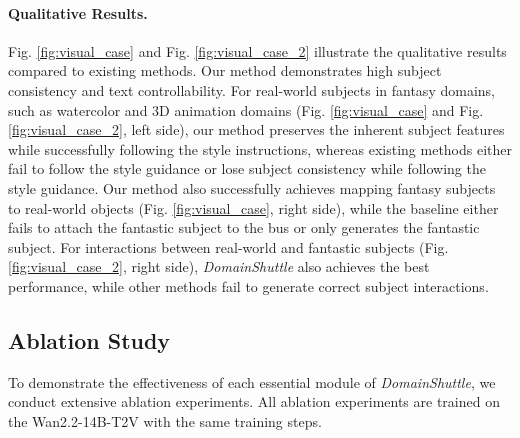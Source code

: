 \paragraph{\textbf{Qualitative Results.}} Fig. \ref{fig:visual_case} and Fig. \ref{fig:visual_case_2} illustrate the qualitative results compared to existing methods. Our method demonstrates high subject consistency and text controllability. For real-world subjects in fantasy domains, such as watercolor and 3D animation domains (Fig. \ref{fig:visual_case} and Fig. \ref{fig:visual_case_2}, left side), our method preserves the inherent subject features while successfully following the style instructions, whereas existing methods either fail to follow the style guidance or lose subject consistency while following the style guidance. Our method also successfully achieves mapping fantasy subjects to real-world objects (Fig. \ref{fig:visual_case}, right side), while the baseline either fails to attach the fantastic subject to the bus or only generates the fantastic subject. For interactions between real-world and fantastic subjects (Fig. \ref{fig:visual_case_2}, right side), \textit{DomainShuttle} also achieves the best performance, while other methods fail to generate correct subject interactions. %



\subsection{Ablation Study}
To demonstrate the effectiveness of each essential module of \textit{DomainShuttle}, we conduct extensive ablation experiments. All ablation experiments are trained on the Wan2.2-14B-T2V with the same training steps.



